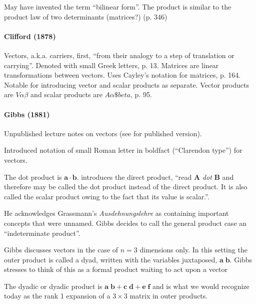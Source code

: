May have invented the term ``bilinear form''.
The product is similar to the product law of two determinants (matrices?) (p. 346)


\paragraph{Clifford (1878)~\cite{Clifford1878}}

Vectors, a.k.a. carriers, first, ``from their analogy to a step of translation or carrying''.
Denoted with small Greek letters, p. 13.
Matrices are linear transformations between vectors. Uses Cayley's notation for matrices, p. 164.
Notable for introducing vector and scalar products as separate.
Vector products are $V\alpha\beta$ and scalar products are $A\alpha\$beta$, p. 95.



\paragraph{Gibbs (1881)~\cite{Gibbs1881}}

Unpublished lecture notes on vectors (see \cite{Wilson1901} for published version).

Introduced notation of small Roman letter in boldfact (``Clarendon type'') for vectors.

The dot product is $\mathbf a \cdot \mathbf b$.
\cite[p. 55]{Wilson1901} introduces the direct product, ``read \textbf{A} \textit{dot} \textbf{B} and therefore may be called the dot product instead of the direct product. It is also called the scalar product owing to the fact that its value is scalar.''.

He acknowledges Grassmann's \textit{Ausdehnungslehre} as containing important concepts that were unnamed. Gibbs decides to call the general product case an ``indeterminate product''.

Gibbs discusses vectors in the case of $n=3$ dimensions only. In this setting the outer product is called a dyad, written with the variables juxtaposed, $\mathbf{ a \; b }$.
Gibbs stresses to think of this as a formal product waiting to act upon a vector

The dyadic or dyadic product is $\mathbf{ a \; b } + \mathbf{ c \; d } + \mathbf{ e \; f }$ and is what we would recognize today as the rank 1 expansion of a $3 \times 3$ matrix in outer products.


